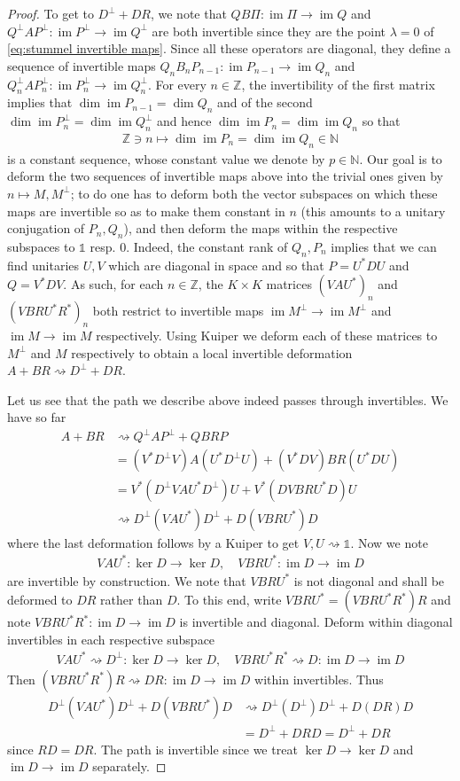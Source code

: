 \documentclass[a4paper,10pt]{article}
\numberwithin{equation}{section}
\theoremstyle{plain}
\theoremstyle{plain}
\theoremstyle{plain}
\theoremstyle{plain}
\theoremstyle{plain}
\theoremstyle{remark}
\theoremstyle{definition}
\theoremstyle{plain}
\newcommand{\ZZ}{\mathbb{Z}}
\newcommand{\NN}{\mathbb{N}}
\newcommand{\Id}{\mathds{1}}
\newcommand{\im}{\operatorname{im}}
\newcommand{\eq}[1]{\begin{align*}#1\end{align*}}
\begin{document}
\begin{proof}
		To get to $D^\perp+DR$, we note that $QB\Pi:\im \Pi\to\im Q$ and $Q^\perp A P^\perp:\im P^\perp \to \im Q^\perp$ are both invertible since they are the point $\lambda=0$ of \cref{eq:stummel invertible maps}. Since all these operators are diagonal, they define a sequence of invertible maps $Q_n B_n P_{n-1} : \im P_{n-1}\to\im Q_n$ and $Q_n^\perp A P_n^\perp : \im P_n^\perp \to \im Q_n^\perp$. For every $n\in\ZZ$, the invertibility of the first matrix implies that $\dim\im P_{n-1} = \dim Q_n$ and of the second $\dim \im P_{n}^\perp = \dim \im Q_n^\perp$ and hence $\dim \im P_{n} = \dim \im Q_n$ so that \eq{\ZZ\ni n\mapsto \dim \im P_n = \dim\im Q_n \in \NN} is a constant sequence, whose constant value we denote by $p\in\NN$. Our goal is to deform the two sequences of invertible maps above into the trivial ones given by $n\mapsto M,M^\perp$; to do one has to deform both the vector subspaces on which these maps are invertible so as to make them constant in $n$ (this amounts to a unitary conjugation of $P_n,Q_n$), and then deform the maps within the respective subspaces to $\Id$ resp. $0$. Indeed, the constant rank of $Q_n,P_n$ implies that we can find unitaries $U,V$ which are diagonal in space and so that $P = U^\ast D U$ and $Q = V^\ast D V$. As such, for each $n\in\ZZ$, the $K\times K$ matrices $(V A U^\ast)_n$ and $(V B R U^\ast R^*)_n$ both restrict to invertible maps $\im M^\perp \to \im M^\perp$ and $\im M \to \im M$ respectively. Using Kuiper we deform each of these matrices to $M^\perp$ and $M$ respectively to obtain a local invertible deformation  $A+BR\rightsquigarrow D^\perp+D R$.
		
		Let us see that the path we describe above indeed passes through invertibles. We have so far
		\eq{
			A+BR & \rightsquigarrow Q^\perp AP^\perp + QBRP  
			\\ & =  (V^*D^\perp V) A (U^* D^\perp U) + (V^*D V) BR (U^* D U) 
			\\ & =  V^*(D^\perp V A U^* D^\perp) U + V^* (D V BR U^* D) U 
			\\ & \rightsquigarrow D^\perp (V A U^*) D^\perp + D (V BR U^*) D
		} where the last deformation follows by a Kuiper to get $V,U\rightsquigarrow\Id$. 
		Now we note
		\eq{
			VAU^*:\ker D\to\ker D,\quad V BR U^*:\im D\to \im D
		}
		are invertible by construction. We note that $V BR U^*$ is not diagonal and shall be deformed to $DR$ rather than $D$. To this end, write $V BR U^*=(V BR U^*R^*)R$ and note $V BR U^*R^*:\im D\to\im D$ is invertible and diagonal. Deform within diagonal invertibles in each respective subspace
		\eq{
			VAU^*\rightsquigarrow D^\perp : \ker D\to\ker D,\quad V BR U^*R^* \rightsquigarrow D:\im D\to\im D
		}
		Then $(V BR U^*R^*) R \rightsquigarrow DR:\im D\to\im D$ within invertibles. Thus
		\eq{
			D^\perp (V A U^*) D^\perp + D (V BR U^*) D &\rightsquigarrow D^\perp (D^\perp) D^\perp + D (DR) D \\
			&=D^\perp + D RD = D^\perp +DR
		}
		since $RD=DR$. The path is invertible since we treat $\ker D\to\ker D$ and $\im D\to \im D$ separately.
		

\end{proof}
\end{document}
